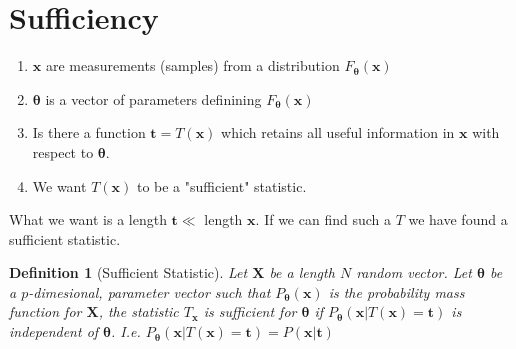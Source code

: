 \documentclass[a4paper]{article}
\newtheorem*{defn}{Definition}
\begin{document}
\section*{Sufficiency}
\begin{enumerate}
  \item $\mathbf{x}$ are measurements (samples) from a distribution $F_{\bm{\theta}}(\mathbf{x})$
  \item $\bm{\theta}$ is a vector of parameters definining $F_{\bm{\theta}}(\mathbf{x})$
  \item Is there a function $\mathbf{t} = T(\mathbf{x})$ which  retains all useful information in $\mathbf{x}$ with respect to $\bm{\theta}$.
  \item We want $T(\mathbf{x})$ to be a "sufficient" statistic.
\end{enumerate}
What we want is a length $\mathbf{t} \ll$ length $\mathbf{x}$. If we can find such a $T$ we have found a sufficient statistic. 

\begin{defn}[Sufficient Statistic]
  Let $\mathbf{X}$ be a length $N$ random vector. Let $\bm{\theta}$ be a $p$-dimesional, parameter vector such that $P_{\bm{\theta}}(\mathbf{x})$ is the probability mass function for $\mathbf{X}$, the statistic $T_{\mathbf{x}}$ is sufficient for $\bm{\theta}$ if $P_{\bm{\theta}}(\mathbf{x} | T(\mathbf{x}) = \mathbf{t})$ is independent of $\bm{\theta}$. I.e.  $P_{\bm{\theta}}(\mathbf{x} | T(\mathbf{x}) = \mathbf{t}) = P(\mathbf{x} | \mathbf{t})$
\end{defn}
\end{document}
